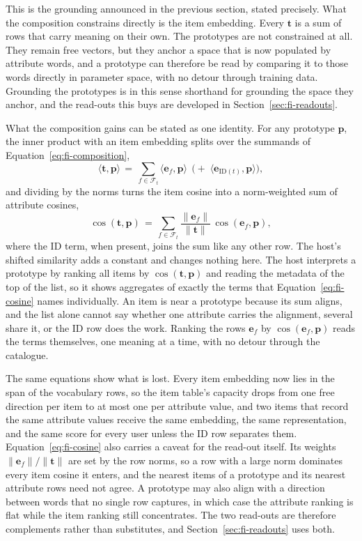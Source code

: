 This is the grounding announced in the previous section, stated
precisely. What the composition constrains directly is the item
embedding. Every $\mathbf{t}$ is a sum of rows that carry meaning on
their own. The prototypes are not constrained at all. They remain free
vectors, but they anchor a space that is now populated by attribute
words, and a prototype can therefore be read by comparing it to those
words directly in parameter space, with no detour through training data.
Grounding the prototypes is in this sense shorthand for grounding the
space they anchor, and the read-outs this buys are developed in
Section~\ref{sec:fi-readouts}.

What the composition gains can be stated as one identity. For any
prototype $\mathbf{p}$, the inner product with an item embedding splits
over the summands of Equation~\ref{eq:fi-composition},
\begin{equation}
\langle \mathbf{t}, \mathbf{p} \rangle
\,=\, \sum_{f \in \mathcal{F}_t} \langle \mathbf{e}_f, \mathbf{p} \rangle
\;\,\bigl(+\; \langle \mathbf{e}_{\mathrm{ID}(t)}, \mathbf{p} \rangle\bigr),
\label{eq:fi-decomposition}
\end{equation}
and dividing by the norms turns the item cosine into a norm-weighted
sum of attribute cosines,
\begin{equation}
\cos(\mathbf{t}, \mathbf{p})
\,=\, \sum_{f \in \mathcal{F}_t}
\frac{\lVert \mathbf{e}_f \rVert}{\lVert \mathbf{t} \rVert}\,
\cos(\mathbf{e}_f, \mathbf{p}),
\label{eq:fi-cosine}
\end{equation}
where the ID term, when present, joins the sum like any other row. The
host's shifted similarity adds a constant and changes nothing here. The
host interprets a prototype by ranking all items by
$\cos(\mathbf{t}, \mathbf{p})$ and reading the metadata of the top of
the list, so it shows aggregates of exactly the terms that
Equation~\ref{eq:fi-cosine} names individually. An item is near a
prototype because its sum aligns, and the list alone cannot say whether
one attribute carries the alignment, several share it, or the ID row
does the work. Ranking the rows $\mathbf{e}_f$ by
$\cos(\mathbf{e}_f, \mathbf{p})$ reads the terms themselves, one
meaning at a time, with no detour through the catalogue.

The same equations show what is lost. Every item embedding now lies in
the span of the vocabulary rows, so the item table's capacity drops
from one free direction per item to at most one per attribute value,
and two items that record the same attribute values receive the same
embedding, the same representation, and the same score for every user
unless the ID row separates them. Equation~\ref{eq:fi-cosine} also
carries a caveat for the read-out itself. Its weights
$\lVert \mathbf{e}_f \rVert / \lVert \mathbf{t} \rVert$ are set by the
row norms, so a row with a large norm dominates every item cosine it
enters, and the nearest items of a prototype and its nearest attribute
rows need not agree. A prototype may also align with a direction
between words that no single row captures, in which case the attribute
ranking is flat while the item ranking still concentrates. The two
read-outs are therefore complements rather than substitutes, and
Section~\ref{sec:fi-readouts} uses both.

